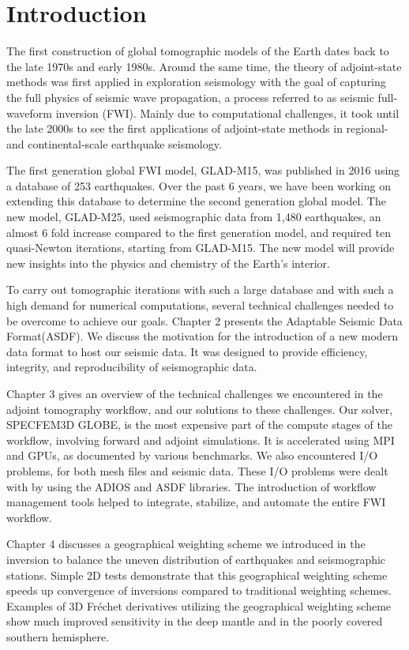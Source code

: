 \chapter{Introduction\label{ch:intro}}

The first construction of global tomographic models of the Earth dates back to the late 1970s
and early 1980s.
Around the same time,
the theory of adjoint-state methods was first applied in exploration seismology with the goal of capturing the full physics of seismic wave propagation,
a process referred to as seismic full-waveform inversion (FWI).
Mainly due to computational challenges,
it took until the late 2000s to see the first applications of adjoint-state methods in regional- and continental-scale earthquake seismology.

The first generation global FWI
model, GLAD-M15, was published in 2016 using a database of 253 earthquakes.
Over the past 6 years, we have been working on extending this database to determine
the second generation global model. The new model, GLAD-M25, used seismographic data from 1,480 earthquakes,
an almost 6 fold increase compared to the first generation model, and required ten quasi-Newton iterations, starting from GLAD-M15.
The new model will provide new insights into
the physics and chemistry of the Earth's interior.

To carry out tomographic iterations with such a large database and with such a high demand for numerical
computations, several technical challenges needed to be overcome to achieve our goals.
Chapter 2 presents the Adaptable Seismic Data Format(ASDF). We discuss the motivation
for the introduction of a new modern data format to host our seismic data. It was designed to provide efficiency, integrity, and reproducibility
of seismographic data.

Chapter 3 gives an overview of the technical challenges we encountered in the adjoint tomography workflow, and our solutions to these challenges.
Our solver, SPECFEM3D GLOBE, is the most expensive part of the compute stages of the workflow,
involving forward and adjoint simulations. It is accelerated using MPI and GPUs, as documented by various benchmarks. We also encountered I/O problems, for both
mesh files and seismic data.
These I/O problems were dealt with by using the ADIOS and ASDF libraries.
The introduction of workflow management tools helped to integrate, stabilize, and automate the entire FWI workflow.

Chapter 4 discusses a geographical weighting scheme we introduced in the inversion to balance
the uneven distribution of earthquakes and seismographic stations.
Simple 2D tests demonstrate that this geographical weighting scheme speeds up convergence of inversions
compared to traditional weighting schemes.
Examples of 3D Fr\'echet derivatives utilizing the geographical weighting scheme show much improved sensitivity in the deep mantle and in the poorly covered southern hemisphere.

